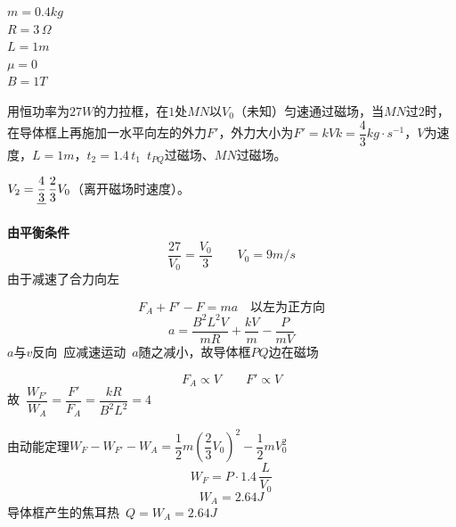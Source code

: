 \begin{problem}

\noindent $m=0.4\unit{kg}$\\
$R=3\,\Omega$\\
$L=1\unit{m}$\\
$\mu=0$\\
$B=1\unit{T}$

用恒功率为$27\unit{W}$的力拉框，在$1$处$MN$以$V_0$（未知）匀速通过磁场，当$MN$过$2$时，在导体框上再施加一水平向左的外力$F'$，外力大小为$F'=kV$\quad $k=\dfrac{4}{3}\unit{kg\cdot s^{-1}}$，$V$为速度，$L=1\unit{m}$，{\small $t_2=1.4\,t_1$}\ $t_{PQ}$过磁场、$MN$过磁场。
\par\smallskip
$V_2=\struck{\dfrac{4}{3}}\,\dfrac{2}{3}V_0$（离开磁场时速度）。
\begin{solution}
\textbf{由平衡条件}
\[
\frac{27}{V_0}=\frac{V_0}{3}\qquad V_0=9\unit{m/s}
\]
\hfill {\small 由于减速了合力向左}\par %
\[
F_A+F'-F=ma\quad\text{以左为正方向}
\]
\[
a=\frac{B^2L^2V}{mR}+\frac{kV}{m}-\frac{P}{mV}
\]
$a$与$v$反向\ 应减速运动\ $a$随之减小，故导体框$PQ$边在磁场%

\[
F_A\propto V\qquad F'\propto V
\]
故\ $\dfrac{W_{F'}}{W_A}=\dfrac{F'}{F_A}=\dfrac{kR}{B^2L^2}=4$

由动能定理\quad $W_F-W_{F'}-W_A=\dfrac{1}{2}m\left(\dfrac{2}{3}V_0\right)^2-\dfrac{1}{2}mV_0^2$
\[
W_F=P\cdot 1.4\,\frac{L}{V_0}
\]
\[
W_A=2.64\unit{J}
\]
导体框产生的焦耳热\ $Q=W_A=2.64\unit{J}$
\end{solution}
\end{problem}
